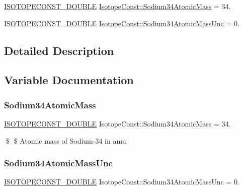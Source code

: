 \begin{DoxyCompactItemize}
\item 
\mbox{\hyperlink{group___isotope_const-_macros_ga8f45a7272ce02c0b4c65c44636ed719a}{I\+S\+O\+T\+O\+P\+E\+C\+O\+N\+S\+T\+\_\+\+D\+O\+U\+B\+LE}} \mbox{\hyperlink{group___isotope_const-_sodium-_na34_ga5d22c2b085852f4b1031129db4120312}{Isotope\+Const\+::\+Sodium34\+Atomic\+Mass}} = 34.
\item 
\mbox{\hyperlink{group___isotope_const-_macros_ga8f45a7272ce02c0b4c65c44636ed719a}{I\+S\+O\+T\+O\+P\+E\+C\+O\+N\+S\+T\+\_\+\+D\+O\+U\+B\+LE}} \mbox{\hyperlink{group___isotope_const-_sodium-_na34_ga7d93159a210b44a3eae935bd495a4eb6}{Isotope\+Const\+::\+Sodium34\+Atomic\+Mass\+Unc}} = 0.
\end{DoxyCompactItemize}


\subsection{Detailed Description}


\subsection{Variable Documentation}
\mbox{\label{group___isotope_const-_sodium-_na34_ga5d22c2b085852f4b1031129db4120312}} 
\subsubsection{\texorpdfstring{Sodium34\+Atomic\+Mass}{Sodium34AtomicMass}}
{\footnotesize\ttfamily \mbox{\hyperlink{group___isotope_const-_macros_ga8f45a7272ce02c0b4c65c44636ed719a}{I\+S\+O\+T\+O\+P\+E\+C\+O\+N\+S\+T\+\_\+\+D\+O\+U\+B\+LE}} Isotope\+Const\+::\+Sodium34\+Atomic\+Mass = 34.}

\$ \$ Atomic mass of Sodium-\/34 in amu. \mbox{\label{group___isotope_const-_sodium-_na34_ga7d93159a210b44a3eae935bd495a4eb6}} 
\subsubsection{\texorpdfstring{Sodium34\+Atomic\+Mass\+Unc}{Sodium34AtomicMassUnc}}
{\footnotesize\ttfamily \mbox{\hyperlink{group___isotope_const-_macros_ga8f45a7272ce02c0b4c65c44636ed719a}{I\+S\+O\+T\+O\+P\+E\+C\+O\+N\+S\+T\+\_\+\+D\+O\+U\+B\+LE}} Isotope\+Const\+::\+Sodium34\+Atomic\+Mass\+Unc = 0.}


